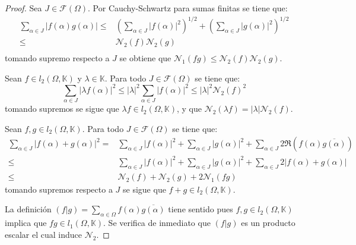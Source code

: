 \documentclass[12pt]{report}
\theoremstyle{largebreak}
\newcommand\abs[1]{\ensuremath{\big|#1\big|}}
\newcommand\pint[2]{\ensuremath{\left(#1\big| #2\right)}}
\newcommand\conj[1]{\ensuremath{\overline{#1}}}
\begin{document}
    \begin{proof}
        Sea $J\in\mathcal{F}(\Omega)$. Por Cauchy-Schwartz para sumas finitas se tiene que:
        \begin{equation*}
            \begin{split}
                \sum_{\alpha\in J }\abs{f(\alpha)g(\alpha)}\leq&\left( \sum_{\alpha\in J }\abs{f(\alpha)}^2 \right)^{1/2}+\left( \sum_{\alpha\in J }\abs{g(\alpha)}^2 \right)^{1/2}\\
                \leq&\mathcal{N}_2(f)\mathcal{N}_2(g) \\
            \end{split}
        \end{equation*}
        tomando supremo respecto a $J$ se obtiene que $\mathcal{N}_1(fg)\leq\mathcal{N}_2(f)\mathcal{N}_2(g)$.

        Sean $f\in l_2(\Omega,\mathbb{K})$ y $\lambda\in\mathbb{K}$. Para todo $J\in\mathcal{F}(\Omega)$ se tiene que:
        \begin{equation*}
            \sum_{\alpha\in J}\abs{\lambda f(\alpha)}^2\leq\abs{\lambda}^2\sum_{\alpha\in J}\abs{f(\alpha)}^2\leq\abs{\lambda}^2\mathcal{N}_2(f)^2
        \end{equation*}
        tomando supremos se sigue que $\lambda f\in l_2(\Omega,\mathbb{K})$, y que $\mathcal{N}_2(\lambda f)=\abs{\lambda}\mathcal{N}_2(f)$.

        Sean $f,g\in l_2(\Omega,\mathbb{K})$. Para todo $J\in\mathcal{F}(\Omega)$ se tiene que:
        \begin{equation*}
            \begin{split}
                \sum_{\alpha\in J }\abs{f(\alpha)+g(\alpha)}^2=&\sum_{\alpha\in J }\abs{f(\alpha)}^2+\sum_{\alpha\in J }\abs{g(\alpha)}^2+\sum_{\alpha\in J }2\Re(f(\alpha)\conj{g(\alpha)})\\
                \leq&\sum_{\alpha\in J }\abs{f(\alpha)}^2+\sum_{\alpha\in J }\abs{g(\alpha)}^2+\sum_{\alpha\in J }2\abs{f(\alpha)+g(\alpha)}\\
                \leq& \mathcal{N}_2(f)+\mathcal{N}_2(g)+2\mathcal{N}_1(fg)
            \end{split}
        \end{equation*}
        tomando supremos respecto a $J$ se sigue que $f+g\in l_2(\Omega,\mathbb{K})$.

        La definición $\pint{f}{g}=\sum_{\alpha\in\Omega}f(\alpha)\conj{g(\alpha)}$ tiene sentido pues $f,g\in l_2(\Omega,\mathbb{K})$ implica que $fg\in l_1(\Omega,\mathbb{K})$. Se verifica de inmediato que $\pint{f}{g}$ es un producto escalar el cual induce $\mathcal{N}_2$.


\end{proof}
\end{document}
